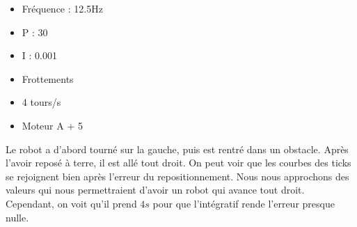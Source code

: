 \documentclass[
	a4paper,									%
	11pt,										%
	twoside,									%
	openright,									%
	notitlepage,									%
	parskip=half,								%
]{scrreprt}										%
\begin{document}
\begin{center}
    
    
    \begin{itemize}
        \item Fréquence : 12.5Hz
        \item P : 30
        \item I : 0.001
        \item Frottements
        \item 4 tours/s
        \item Moteur A + 5
    \end{itemize}
    \end{center}

Le robot a d'abord tourné sur la gauche, puis est rentré dans un obstacle. Après l'avoir reposé à terre, il est allé tout droit. 
On peut voir que les courbes des ticks se rejoignent bien après l'erreur du repositionnement. 
Nous nous approchons des valeurs qui nous permettraient d'avoir 
un robot qui avance tout droit. Cependant, on voit qu'il prend $4s$ pour que l'intégratif rende l'erreur 
presque nulle. \par
\end{document}
